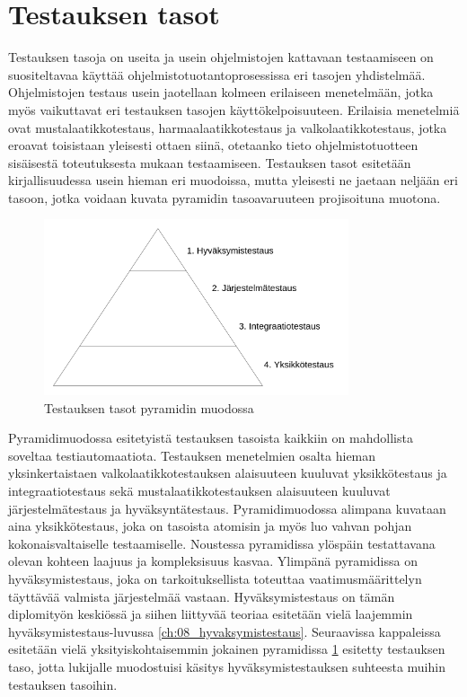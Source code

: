 \section{Testauksen tasot} \label{ch:07_testauksen_tasot}

  Testauksen tasoja on useita ja usein ohjelmistojen kattavaan testaamiseen on suositeltavaa käyttää ohjelmistotuotantoprosessissa eri tasojen yhdistelmää.
  Ohjelmistojen testaus usein jaotellaan kolmeen erilaiseen menetelmään, jotka myös vaikuttavat eri testauksen tasojen käyttökelpoisuuteen.
  Erilaisia menetelmiä ovat mustalaatikkotestaus, harmaalaatikkotestaus ja valkolaatikkotestaus, jotka eroavat toisistaan yleisesti ottaen siinä, otetaanko tieto ohjelmistotuotteen sisäisestä toteutuksesta mukaan testaamiseen.
  Testauksen tasot esitetään kirjallisuudessa usein hieman eri muodoissa, mutta yleisesti ne jaetaan neljään eri tasoon, jotka voidaan kuvata pyramidin tasoavaruuteen projisoituna muotona.

  \begin{figure}[H]
    \centering
    \includegraphics[width=0.8\textwidth]{assets/testing-levels-pyramid.png}
    \caption{Testauksen tasot pyramidin muodossa}
    \label{fig:testing_levels_pyramid}
  \end{figure}

  Pyramidimuodossa esitetyistä testauksen tasoista kaikkiin on mahdollista soveltaa testiautomaatiota.
  Testauksen menetelmien osalta hieman yksinkertaistaen valkolaatikkotestauksen alaisuuteen kuuluvat yksikkötestaus ja integraatiotestaus sekä mustalaatikkotestauksen alaisuuteen kuuluvat järjestelmätestaus ja hyväksyntätestaus.
  Pyramidimuodossa alimpana kuvataan aina yksikkötestaus, joka on tasoista atomisin ja myös luo vahvan pohjan kokonaisvaltaiselle testaamiselle.
  Noustessa pyramidissa ylöspäin testattavana olevan kohteen laajuus ja kompleksisuus kasvaa.
  Ylimpänä pyramidissa on hyväksymistestaus, joka on tarkoituksellista toteuttaa vaatimusmäärittelyn täyttävää valmista järjestelmää vastaan.
  Hyväksymistestaus on tämän diplomityön keskiössä ja siihen liittyvää teoriaa esitetään vielä laajemmin hyväksymistestaus-luvussa \ref{ch:08_hyvaksymistestaus}.
  Seuraavissa kappaleissa esitetään vielä yksityiskohtaisemmin jokainen pyramidissa \ref{fig:testing_levels_pyramid} esitetty testauksen taso, jotta lukijalle muodostuisi käsitys hyväksymistestauksen suhteesta muihin testauksen tasoihin.

